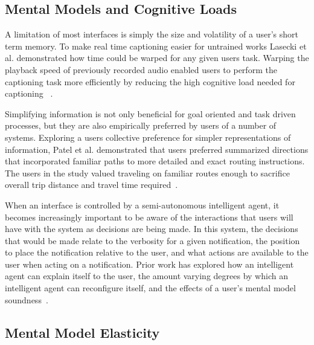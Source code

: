\subsection{                  Mental Models and Cognitive Loads              }

A limitation of most interfaces is simply the size and volatility of a user's
short term memory.  To make real time captioning easier for untrained works
Lasecki et al. demonstrated how time could be warped for any given users task.
Warping the playback speed of previously recorded audio enabled users to perform
the captioning task more efficiently by reducing the high cognitive load needed 
for captioning ~\cite{lasecki2013warping}.

Simplifying information is not only beneficial for goal oriented and task driven
processes, but they are also empirically preferred by users of a number of
systems. Exploring a users collective preference for simpler  representations of
information, Patel et al. demonstrated that users preferred summarized
directions that incorporated familiar paths to more detailed and exact routing
instructions. The users in the study valued traveling on  familiar routes enough
to sacrifice overall trip distance and travel time
required~\cite{patel2006personalizing}.

When an interface is controlled by a semi-autonomous intelligent agent, it
becomes increasingly important to be aware of the interactions that users will
have with the system as decisions are being made.  In this system, the
decisions that would be made relate to the verbosity for a given notification,
the position to place the notification relative to the user, and what actions
are available to the user when acting on a notification.  Prior work has
explored how an intelligent agent can explain itself to the user, the amount
varying degrees by which an intelligent agent can reconfigure itself, and the
effects of a user's mental model soundness~\cite{kulesza2012tell}.

\subsection{                   Mental Model Elasticity                       }

